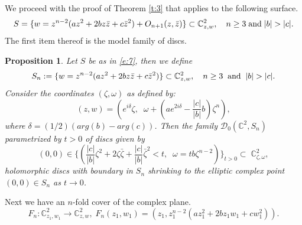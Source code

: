 \documentclass{amsart}
\newcommand{\be}{\begin{equation}}
\newcommand{\ee}{\end{equation}}
\newtheorem{proposition}[theorem]{Proposition}
\begin{document}
We proceed with the proof of Theorem \ref{t:3} that applies to the following surface.
\be \label{e:Shigher}
 S=\{ w=z^{n-2}(a z^2 + 2b z \bar z + c \bar{z}^2) + O_{n+1}(z,\bar z) \} \subset {\mathbb{C}}^2_{z,w},\quad  n \ge 3 \; {\rm and}  \;  |b|>|c|. 
\ee 
The first item thereof is the model family of discs.
\begin{proposition}\label{p:9}
Let $S$ be as in \eqref{e:7}, then we define
\begin{equation}\label{e:oscn}
  S_n:=\{ w=z^{n-2}(a z^2 + 2b z \bar z + c \bar{z}^2)\} \subset  \mathbb{C}^2_{z,w} ,  \quad
n \ge 3 \;\; {\rm and}  \;\;   |b|>|c|. 
\end{equation}
Consider the coordinates $(\zeta,\omega)$ as defined by: 
\[
(z,w)=\left(e^{i\delta}\zeta,\;\; \omega + (a e^{2i\delta}-{\textstyle{\frac{|c|}{|b|}}}b)\zeta^{n} \right),
\]
where $\delta=(1/2)(arg(b)-arg(c))$. Then the family ${\mathcal  D}_0({\mathbb{C}}^2,S_n)$ parametrized by $t>0$ of discs given by 
\begin{equation}
    (0,0) \in \Big\{ \left({\textstyle{\frac{|c|}{|b|}}} \zeta^{2} + 2 \zeta \bar \zeta +{\textstyle{\frac{|c|}{|b|} }}\bar \zeta^{2} < t,\;\; \omega=tb\zeta^{n-2}\right)\Big\}_{t>0} \subset \;{\mathbb{C}}^2_{\zeta ,\omega},
\end{equation}
holomorphic discs with boundary in  $S_n$ shrinking to the elliptic complex point $(0,0) \in  S_n$ as $t\to 0$.
\end{proposition}

Next we have an $n$-fold cover of the complex plane.
\be \label{e:covern}  F_n : \mathbb{C}^2_{z_1,w_1} \to \mathbb{C}^2_{z,w} , \;
F_n(z_1,w_1)=(z_1, z_1^{n-2}(a z_1^2 + 2b z_1 w_1 + c w_1^2) ).
\ee
\end{document}
